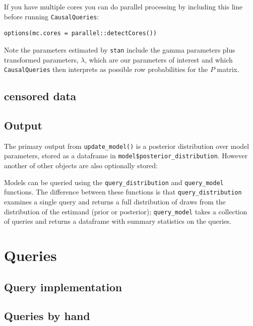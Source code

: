 \documentclass[
  article]{jss}
\begin{document}
If you have multiple cores you can do parallel processing by including
this line before running \texttt{CausalQueries}:

\begin{verbatim}
options(mc.cores = parallel::detectCores())
\end{verbatim}

Note the parameters estimated by \texttt{stan} include the gamma
parameters plus transformed parameters, \(\lambda\), which are our
parameters of interest and which \texttt{CausalQueries} then interprets
as possible row probabilities for the \(P\) matrix.

\hypertarget{censored-data}{%
\subsection{censored data}\label{censored-data}}

\hypertarget{output}{%
\subsection{Output}\label{output}}

The primary output from \texttt{update\_model()} is a posterior
distribution over model parameters, stored as a dataframe in
\texttt{model\$posterior\_distribution}. However another of other
objects are also optionally stored:

Models can be queried using the \texttt{query\_distribution} and
\texttt{query\_model} functions. The difference between these functions
is that \texttt{query\_distribution} examines a single query and returns
a full distribution of draws from the distribution of the estimand
(prior or posterior); \texttt{query\_model} takes a collection of
queries and returns a dataframe with summary statistics on the queries.

\hypertarget{queries}{%
\section{Queries}\label{queries}}

\hypertarget{query-implementation}{%
\subsection{Query implementation}\label{query-implementation}}

\hypertarget{queries-by-hand}{%
\subsection{Queries by hand}\label{queries-by-hand}}
\end{document}
